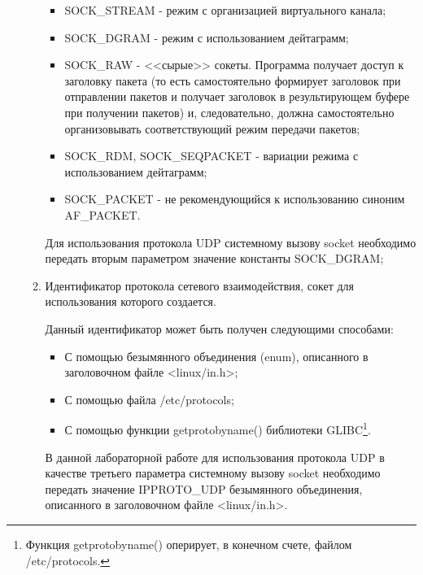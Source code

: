 \begin{enumerate}
\begin{enumerate}
\begin{itemize}
						\item SOCK\_STREAM - режим с организацией виртуального канала;
						\item SOCK\_DGRAM - режим с использованием дейтаграмм;
						\item SOCK\_RAW - <<сырые>> сокеты. Программа получает доступ к заголовку пакета (то есть самостоятельно формирует заголовок
						при отправлении пакетов и получает заголовок в результирующем буфере при получении пакетов) и, следовательно, должна
						самостоятельно организовывать соответствующий режим передачи пакетов;
						\item SOCK\_RDM, SOCK\_SEQPACKET - вариации режима с использованием дейтаграмм;
						\item SOCK\_PACKET - не рекомендующийся к использованию синоним\\AF\_PACKET.

					\end{itemize}

					Для использования протокола UDP системному вызову socket необходимо передать вторым параметром значение константы SOCK\_DGRAM;

				\item Идентификатор протокола сетевого взаимодействия, сокет для использования которого создается.
				
					Данный идентификатор может быть получен следующими способами:

					\begin{itemize}

						\item С помощью безымянного объединения (enum), описанного в заголовочном файле <linux/in.h>;
						\item С помощью файла /etc/protocols;
						\item С помощью функции getprotobyname() библиотеки GLIBC\footnote{Функция getprotobyname() оперирует, в конечном счете,
						файлом /etc/protocols.}.

					\end{itemize}

					В данной лабораторной работе для использования протокола UDP в качестве третьего параметра системному вызову socket необходимо передать
					значение \linebreak IPPROTO\_UDP безымянного объединения, описанного в заголовочном файле \linebreak <linux/in.h>.

			\end{enumerate}


\end{enumerate}
